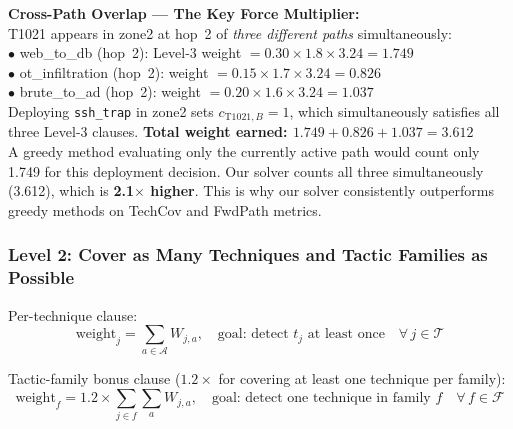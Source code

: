 \documentclass[journal]{IEEEtran}
\newcommand{\calT}{\mathcal{T}}
\newcommand{\calA}{\mathcal{A}}
\begin{document}
\begin{examplebox}
\textbf{Cross-Path Overlap --- The Key Force Multiplier:}\\[3pt]
T1021 appears in zone2 at hop~2 of \emph{three different paths}
simultaneously:\\
\hspace*{10pt}$\bullet$ web\_to\_db (hop~2): Level-3 weight
$= 0.30\times1.8\times3.24 = 1.749$\\
\hspace*{10pt}$\bullet$ ot\_infiltration (hop~2): weight
$= 0.15\times1.7\times3.24 = 0.826$\\
\hspace*{10pt}$\bullet$ brute\_to\_ad (hop~2): weight
$= 0.20\times1.6\times3.24 = 1.037$\\[3pt]
Deploying \texttt{ssh\_trap} in zone2 sets
$c_{\text{T1021},B}=1$, which simultaneously satisfies all
three Level-3 clauses.
\textbf{Total weight earned: $1.749+0.826+1.037=3.612$}\\[3pt]
A greedy method evaluating only the currently active path
would count only 1.749 for this deployment decision.
Our solver counts all three simultaneously (3.612),
which is \textbf{2.1$\times$ higher}.
This is why our solver consistently outperforms greedy
methods on TechCov and FwdPath metrics.
\end{examplebox}

\subsubsection{Level 2: Cover as Many Techniques and
              Tactic Families as Possible}

Per-technique clause:
\begin{equation}
  \text{weight}_j = \sum_{a \in \calA} W_{j,a},
  \quad \text{goal: detect } t_j
  \text{ at least once} \quad \forall\, j \in \calT
\end{equation}

Tactic-family bonus clause ($1.2\times$ for covering at least
one technique per family):
\begin{equation}
  \text{weight}_f = 1.2 \times \sum_{j \in f} \sum_a W_{j,a},
  \quad \text{goal: detect one technique in family } f
  \quad \forall\, f \in \mathcal{F}
\end{equation}
\end{document}
